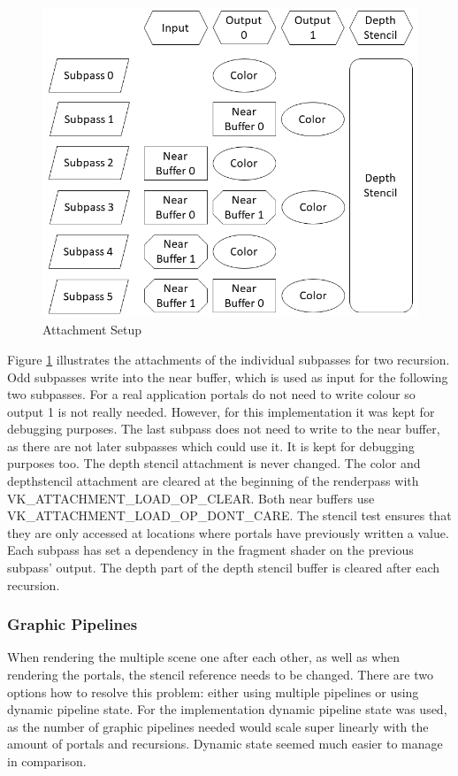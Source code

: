 \begin{figure}[h]
	\includegraphics[width=\linewidth]{images/attachmentsetup.png}
	\caption{Attachment Setup}
	\label{fig:attachments}
\end{figure}

Figure \ref{fig:attachments} illustrates the attachments of the individual subpasses for two recursion. Odd subpasses write into the near buffer, which is used as input for the following two subpasses. For a real application portals do not need to write colour so output 1 is not really needed. However, for this implementation it was kept for debugging purposes.
The last subpass does not need to write to the near buffer, as there are not later subpasses which could use it. It is kept for debugging purposes too. The depth stencil attachment is never changed. The color and depthstencil attachment are cleared at the beginning of the renderpass with VK\_ATTACHMENT\_LOAD\_OP\_CLEAR. Both near buffers use VK\_ATTACHMENT\_LOAD\_OP\_DONT\_CARE. The stencil test ensures that they are only accessed at locations where portals have previously written a value. Each subpass has set a dependency in the fragment shader on the previous subpass' output. The depth part of the depth stencil buffer is cleared after each recursion.


\subsubsection{Graphic Pipelines}
When rendering the multiple scene one after each other, as well as when rendering the portals, the stencil reference needs to be changed. There are two options how to resolve this problem: either using multiple pipelines or using dynamic pipeline state. For the implementation dynamic pipeline state was used, as the number of graphic pipelines needed would scale super linearly with the amount of portals and recursions. Dynamic state seemed much easier to manage in comparison.

